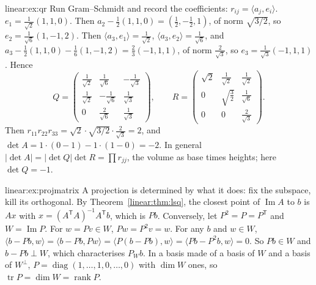 \begin{solution}{linear:ex:qr}
\idea Run Gram--Schmidt and record the coefficients: $r_{ij}=\langle a_j,e_i\rangle$.
\writeup $e_1=\frac1{\sqrt2}(1,1,0)$. Then $a_2-\frac12(1,1,0)=(\frac12,-\frac12,1)$, of norm $\sqrt{3/2}$, so
$e_2=\frac1{\sqrt6}(1,-1,2)$. Then $\langle a_3,e_1\rangle=\frac1{\sqrt2}$, $\langle a_3,e_2\rangle=\frac1{\sqrt6}$, and
$a_3-\frac12(1,1,0)-\frac16(1,-1,2)=\frac23(-1,1,1)$, of norm $\frac2{\sqrt3}$, so $e_3=\frac1{\sqrt3}(-1,1,1)$. Hence
\[
Q=\begin{pmatrix}\frac1{\sqrt2}&\frac1{\sqrt6}&-\frac1{\sqrt3}\\[2pt]\frac1{\sqrt2}&-\frac1{\sqrt6}&\frac1{\sqrt3}\\[2pt]0&\frac2{\sqrt6}&\frac1{\sqrt3}\end{pmatrix},\qquad
R=\begin{pmatrix}\sqrt2&\frac1{\sqrt2}&\frac1{\sqrt2}\\[2pt]0&\sqrt{\frac32}&\frac1{\sqrt6}\\[2pt]0&0&\frac2{\sqrt3}\end{pmatrix}.
\]
Then $r_{11}r_{22}r_{33}=\sqrt2\cdot\sqrt{3/2}\cdot\frac2{\sqrt3}=2$, and $\det A=1\cdot(0-1)-1\cdot(1-0)=-2$. In general
$|\det A|=|\det Q|\det R=\prod r_{jj}$, the volume as base times heights; here $\det Q=-1$.
\end{solution}

\begin{solution}{linear:ex:projmatrix}
\idea A projection is determined by what it does: fix the subspace, kill its orthogonal.
\writeup By Theorem~\ref{linear:thm:lsq}, the closest point of $\operatorname{Im}A$ to $b$ is $Ax$ with $x=(A^{\mathsf T}A)^{-1}
A^{\mathsf T}b$, which is $Pb$. Conversely, let $P^2=P=P^{\mathsf T}$ and $W=\operatorname{Im}P$. For $w=Pv\in W$,
$Pw=P^2v=w$. For any $b$ and $w\in W$, $\langle b-Pb,w\rangle=\langle b-Pb,Pw\rangle=\langle P(b-Pb),w\rangle=\langle
Pb-P^2b,w\rangle=0$. So $Pb\in W$ and $b-Pb\perp W$, which characterises $P_Wb$. In a basis made of a basis of $W$ and a
basis of $W^\perp$, $P=\operatorname{diag}(1,\dots,1,0,\dots,0)$ with $\dim W$ ones, so $\operatorname{tr}P=\dim W=
\operatorname{rank}P$.
\end{solution}

